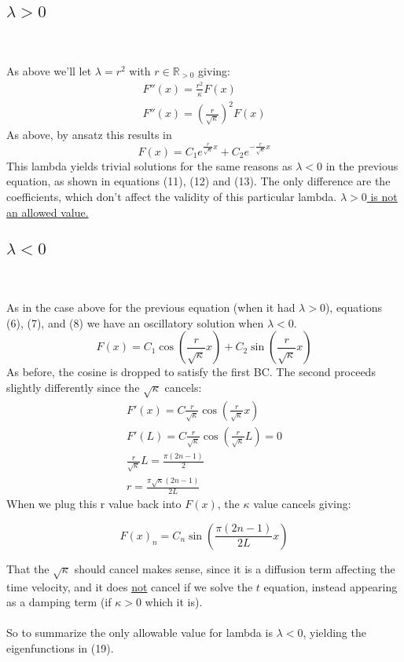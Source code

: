 \documentclass{article}
\begin{document}
\subsection*{\underline{$\lambda > 0$}}~\\
\\
As above we'll let $\lambda = r^2$ with $r \in \mathbb{R}_{>0}$ giving:
\begin{equation}
\begin{aligned}
F''(x) = \frac{r^2}{\kappa} F(x)\\
F''(x) = (\frac{r}{\sqrt{\kappa}})^2 F(x)
\end{aligned}
\end{equation}
As above, by ansatz this results in 
\begin{equation}
F(x) = C_1e^{\frac{r}{\sqrt{\kappa}}x} + C_2e^{-\frac{r}{\sqrt{\kappa}}x}
\end{equation}
This lambda yields trivial solutions for the same reasons as $\lambda <0$ in the previous equation, as shown in equations (11), (12) and (13). The only difference are the coefficients, which don't affect the validity of this particular lambda. \underline{$\lambda > 0$ is not an allowed value.}
\subsection*{\underline{$\lambda < 0$}}~\\
\\
As in the case above for the previous equation (when it had $\lambda >0$), equations (6), (7), and (8) we have an oscillatory solution when $\lambda<0$. 
\begin{equation}
F(x) = C_1\cos(\frac{r}{\sqrt{\kappa}}x) + C_2\sin(\frac{r}{\sqrt{\kappa}}x)
\end{equation}
As before, the cosine is dropped to satisfy the first BC. The second proceeds slightly differently since the $\sqrt{\kappa}$ cancels:
\begin{equation}
\begin{aligned}
F'(x) = C\frac{r}{\sqrt{\kappa}}\cos(\frac{r}{\sqrt{\kappa}}x)\\
F'(L) = C\frac{r}{\sqrt{\kappa}}\cos(\frac{r}{\sqrt{\kappa}}L) = 0\\
\frac{r}{\sqrt{\kappa}}L = \frac{\pi(2n-1)}{2}\\
r = \frac{\pi\sqrt{\kappa}(2n-1)}{2L}
\end{aligned}
\end{equation}
When we plug this r value back into $F(x)$, the $\kappa$ value cancels giving:
\begin{tcolorbox}[minipage,colback=white,arc=0pt,outer arc=0pt]
\begin{equation}
F(x)_n = C_n\sin(\frac{\pi(2n-1)}{2L}x)
\end{equation}
\end{tcolorbox}
That the $\sqrt{\kappa}$ should cancel makes sense, since it is a diffusion term affecting the time velocity, and it does \underline{not} cancel if we solve the $t$ equation, instead appearing as a damping term (if $\kappa > 0$ which it is).\\
\\
So to summarize the only allowable value for lambda is $\lambda < 0$, yielding the eigenfunctions in (19).
\end{document}
